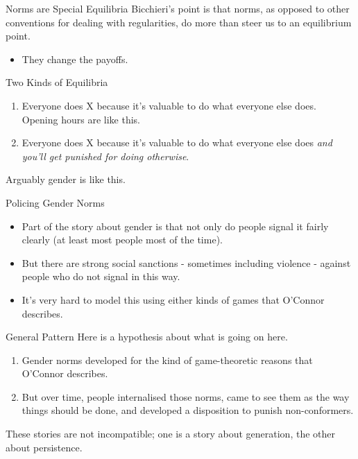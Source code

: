 \documentclass[
  ignorenonframetext,
]{beamer}
\providecommand{\tightlist}{%
  \setlength{\itemsep}{0pt}\setlength{\parskip}{0pt}}
\begin{document}
\begin{frame}{Norms are Special Equilibria}
\protect\hypertarget{norms-are-special-equilibria}{}
Bicchieri's point is that norms, as opposed to other conventions for
dealing with regularities, do more than steer us to an equilibrium
point.

\begin{itemize}
\tightlist
\item
  They change the payoffs.
\end{itemize}
\end{frame}

\begin{frame}{Two Kinds of Equilibria}
\protect\hypertarget{two-kinds-of-equilibria}{}
\begin{enumerate}[<+->]
\tightlist
\item
  Everyone does X because it's valuable to do what everyone else does.
  Opening hours are like this.
\item
  Everyone does X because it's valuable to do what everyone else does
  \emph{and you'll get punished for doing otherwise}.
\end{enumerate}

\pause

Arguably gender is like this.
\end{frame}

\begin{frame}{Policing Gender Norms}
\protect\hypertarget{policing-gender-norms}{}
\begin{itemize}
\tightlist
\item
  Part of the story about gender is that not only do people signal it
  fairly clearly (at least most people most of the time).
\item
  But there are strong social sanctions - sometimes including violence -
  against people who do not signal in this way.
\item
  It's very hard to model this using either kinds of games that O'Connor
  describes.
\end{itemize}
\end{frame}

\begin{frame}{General Pattern}
\protect\hypertarget{general-pattern}{}
Here is a hypothesis about what is going on here.

\begin{enumerate}
\tightlist
\item
  Gender norms developed for the kind of game-theoretic reasons that
  O'Connor describes.
\item
  But over time, people internalised those norms, came to see them as
  the way things should be done, and developed a disposition to punish
  non-conformers.
\end{enumerate}

These stories are not incompatible; one is a story about generation, the
other about persistence.
\end{frame}
\end{document}
